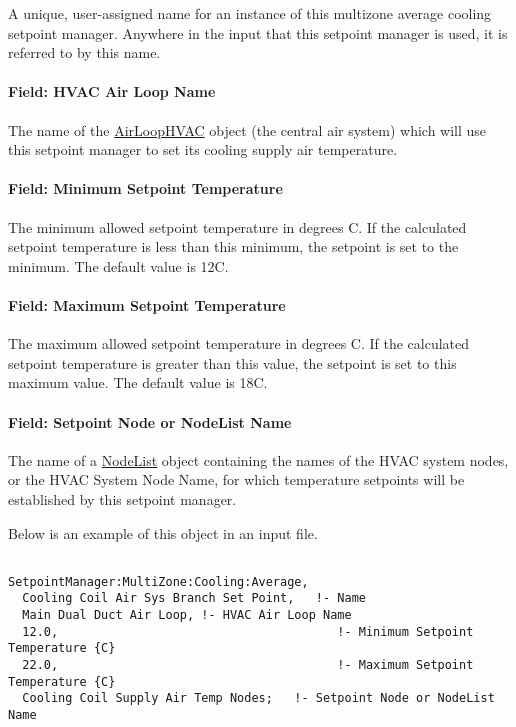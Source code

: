 A unique, user-assigned name for an instance of this multizone average cooling setpoint manager. Anywhere in the input that this setpoint manager is used, it is referred to by this name.

\paragraph{Field: HVAC Air Loop Name}\label{field-hvac-air-loop-name-4}

The name of the \hyperref[airloophvac]{AirLoopHVAC} object (the central air system) which will use this setpoint manager to set its cooling supply air temperature.

\paragraph{Field: Minimum Setpoint Temperature}\label{field-minimum-setpoint-temperature-4}

The minimum allowed setpoint temperature in degrees C. If the calculated setpoint temperature is less than this minimum, the setpoint is set to the minimum. The default value is 12C.

\paragraph{Field: Maximum Setpoint Temperature}\label{field-maximum-setpoint-temperature-4}

The maximum allowed setpoint temperature in degrees C. If the calculated setpoint temperature is greater than this value, the setpoint is set to this maximum value. The default value is 18C.

\paragraph{Field: Setpoint Node or NodeList Name}\label{field-setpoint-node-or-nodelist-name-13}

The name of a \hyperref[nodelist]{NodeList} object containing the names of the HVAC system nodes, or the HVAC System Node Name, for which temperature setpoints will be established by this setpoint manager.

Below is an example of this object in an input file.

\begin{lstlisting}

SetpointManager:MultiZone:Cooling:Average,
  Cooling Coil Air Sys Branch Set Point,   !- Name
  Main Dual Duct Air Loop, !- HVAC Air Loop Name
  12.0,                                       !- Minimum Setpoint Temperature {C}
  22.0,                                       !- Maximum Setpoint Temperature {C}
  Cooling Coil Supply Air Temp Nodes;   !- Setpoint Node or NodeList Name
\end{lstlisting}

